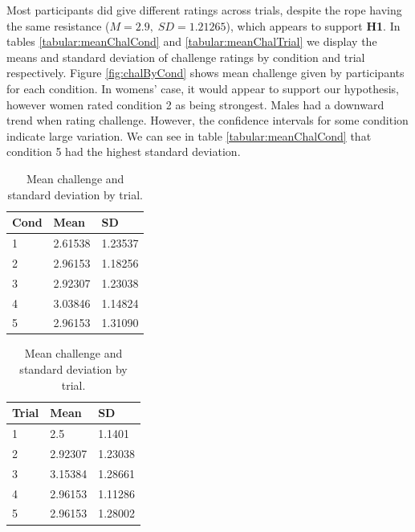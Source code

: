 Most participants did give different ratings across trials, despite the rope having the same resistance ($M=2.9,\; SD=1.21265 $), which appears to support \textbf{H1}. In tables \ref{tabular:meanChalCond} and \ref{tabular:meanChalTrial} we display the means and standard deviation of challenge ratings by condition and trial respectively.
Figure \ref{fig:chalByCond} shows mean challenge given by participants for each condition. In womens' case, it would appear to support our hypothesis, however women rated condition 2 as being strongest. Males had a downward trend when rating challenge. However, the confidence intervals for some condition indicate large variation. We can see in table \ref{tabular:meanChalCond} that condition 5 had the highest standard deviation.

\begin{table}[H]
 \captionsetup{justification=centering,margin=0.1cm}
 \begin{minipage}{.5\linewidth}
     \centering
\begin{tabular}{|lll|}
\hline
Cond & Mean & SD \\
\hline
1 & 2.61538 & 1.23537\\  
2 &  2.96153 & 1.18256\\ 
3 &  2.92307 & 1.23038\\ 
4 &  3.03846 & 1.14824\\  
5 & 2.96153 & 1.31090\\  
\hline
\end{tabular}
\caption{Mean challenge and standard deviation by condition.}
\label{tabular:meanChalCond}
\end{minipage}\hfill
 \begin{minipage}{.5\linewidth}
 \centering
\begin{tabular}{|lll|}
\hline
Trial & Mean & SD \\
\hline
1 & 2.5 & 1.1401\\  
2 & 2.92307 & 1.23038\\  
3 & 3.15384 &  1.28661\\  
4 & 2.96153 & 1.11286\\  
5 & 2.96153 & 1.28002\\  
\hline
\end{tabular}
\caption{Mean challenge and standard deviation by trial.}
\label{tabular:meanChalTrial}
\end{minipage}
\label{tbl:meanChalCond1}
\end{table} 

